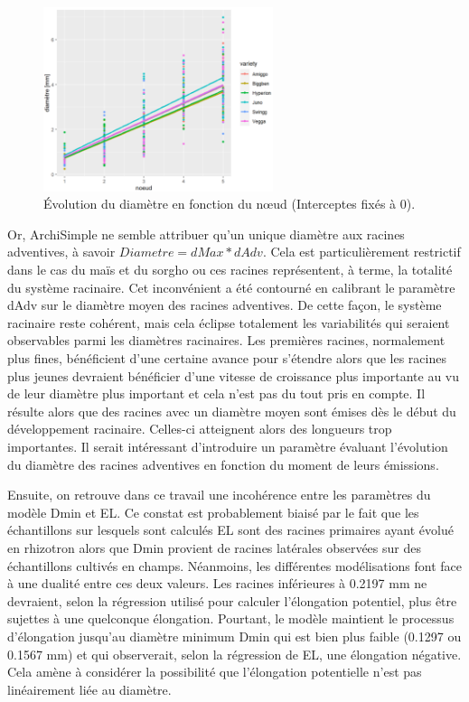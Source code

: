 \begin{figure}[ht]
\centering
\includegraphics[width=0.6\textwidth]{Image/node_dia.png}
\caption{Évolution du diamètre en fonction du nœud (Interceptes fixés à 0).}
\label{fig:node_dia}
\end{figure}

Or, ArchiSimple ne semble attribuer qu'un unique diamètre aux racines adventives, à savoir $Diametre = dMax*dAdv$.
Cela est particulièrement restrictif dans le cas du maïs et du sorgho ou ces racines représentent, à terme, la totalité du système racinaire.
Cet inconvénient a été contourné en calibrant le paramètre dAdv sur le diamètre moyen des racines adventives.
De cette façon, le système racinaire reste cohérent, mais cela éclipse totalement les variabilités qui seraient observables parmi les diamètres racinaires.
Les premières racines, normalement plus fines, bénéficient d'une certaine avance pour s'étendre alors que les racines plus jeunes devraient bénéficier d'une vitesse de croissance plus importante au vu de leur diamètre plus important et cela n'est pas du tout pris en compte.
Il résulte alors que des racines avec un diamètre moyen sont émises dès le début du développement racinaire.
Celles-ci atteignent alors des longueurs trop importantes.
Il serait intéressant d'introduire un paramètre évaluant l'évolution du diamètre des racines adventives en fonction du moment de leurs émissions.
\newline

Ensuite, on retrouve dans ce travail une incohérence entre les paramètres du modèle Dmin et EL.
Ce constat est probablement biaisé par le fait que les échantillons sur lesquels sont calculés EL sont des racines primaires ayant évolué en rhizotron alors que Dmin provient de racines latérales observées sur des échantillons cultivés en champs.
Néanmoins, les différentes modélisations font face à une dualité entre ces deux valeurs.
Les racines inférieures à 0.2197 mm ne devraient, selon la régression utilisé pour calculer l'élongation potentiel, plus être sujettes à une quelconque élongation.
Pourtant, le modèle maintient le processus d'élongation jusqu'au diamètre minimum Dmin qui est bien plus faible (0.1297 ou 0.1567 mm) et qui observerait, selon la régression de EL, une élongation négative.
Cela amène à considérer la possibilité que l'élongation potentielle n'est pas linéairement liée au diamètre.
\newline

